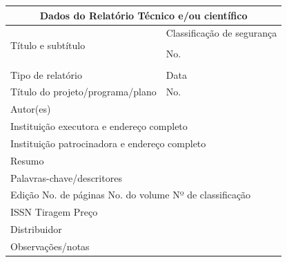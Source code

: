 \documentclass[
	12pt,				%
	oneside,            %
	a4paper,			%
	english,			%
	french,				%
	spanish,			%
	brazil,				%
	]{abntex2}
\begin{document}
\begin{tabular}{|p{9cm}|p{5cm}|}
\hline
\multicolumn{2}{|c|}{\textbf{\large Dados do Relatório Técnico e/ou científico}}\\
\hline
\multirow{4}{10cm}[24pt]{Título e subtítulo}& Classificação de segurança\\
                   & \\
                   \cline{2-2}
                   & No.\\
                   & \\
				
\hline
Tipo de relatório & Data\\
\hline
Título do projeto/programa/plano & No.\\
\hline
\multicolumn{2}{|l|}{Autor(es)} \\
\hline
\multicolumn{2}{|l|}{Instituição executora e endereço completo} \\
\hline
\multicolumn{2}{|l|}{Instituição patrocinadora e endereço completo} \\
\hline
\multicolumn{2}{|l|}{Resumo}\\[3cm]
\hline
\multicolumn{2}{|l|}{Palavras-chave/descritores}\\
\hline
\multicolumn{2}{|l|}{
Edição \hfill No. de páginas \hfill No. do volume \hfill Nº de classificação \phantom{XXXX}} \\
\hline
\multicolumn{2}{|l|}{
ISSN \hfill \hfill Tiragem \hfill Preço \phantom{XXXXXXXX}} \\
\hline
\multicolumn{2}{|l|}{Distribuidor} \\
\hline
\multicolumn{2}{|l|}{Observações/notas}\\[3cm]
\hline
\end{tabular}
\end{document}
